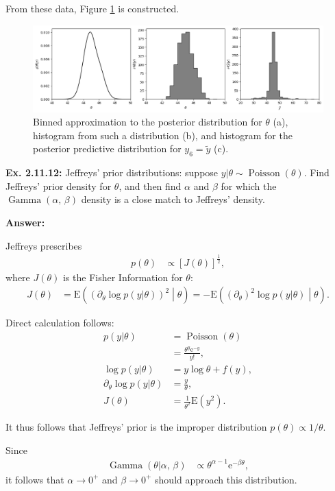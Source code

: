 \documentclass{article}
\newcommand\oname\operatorname
\begin{document}
From these data, Figure \ref{fig:2.11.11} is constructed.
\begin{figure}[h]
	\center
	\includegraphics[width=\textwidth]{Numerical/2.11.11.png}
	\caption{Binned approximation to the posterior distribution for $\theta$ (a), histogram from such a distribution (b), and histogram for the posterior predictive distribution for $y_6=\tilde{y}$ (c).}
	\label{fig:2.11.11}
\end{figure}

\textbf{Ex. 2.11.12: }Jeffreys' prior distributions: suppose $y|\theta\sim\oname{Poisson}(\theta)$. Find Jeffreys' prior density for $\theta$, and then find $\alpha$ and $\beta$ for which the $\oname{Gamma}(\alpha,\,\beta)$ density is a close match to Jeffreys' density.

\textbf{Answer:}

Jeffreys prescribes
\begin{align*}
	p(\theta)&\propto\left[J(\theta)\right]^{\frac12},
\end{align*}
where $J(\theta)$ is the Fisher Information for $\theta$:
\begin{align*}
	J(\theta)&=\mathrm E\left(\left(\partial_\theta\log p(y|\theta)\right)^2\middle|\theta\right)=-\mathrm E\left((\partial_\theta)^2\log p(y|\theta)\middle|\theta\right).
\end{align*}

Direct calculation follows:
\begin{align*}
	p(y|\theta)&=\oname{Poisson}(\theta)\\
	&=\frac{\theta^y\mathrm e^{-y}}{y!},\\
	\log p(y|\theta)&=y\log\theta+f(y),\\
	\partial_\theta\log p(y|\theta)&=\frac{y}\theta,\\
	J(\theta)&=\frac1{\theta^2}\mathrm E\left(y^2\right).
\end{align*}

It thus follows that Jeffreys' prior is the improper distribution $p(\theta)\propto1/\theta$.

Since
\begin{align*}
	\oname{Gamma}(\theta|\alpha,\,\beta)&\propto\theta^{\alpha-1}\mathrm e^{-\beta\theta},
\end{align*}
it follows that $\alpha\rightarrow0^+$ and $\beta\rightarrow0^+$ should approach this distribution.
\end{document}

